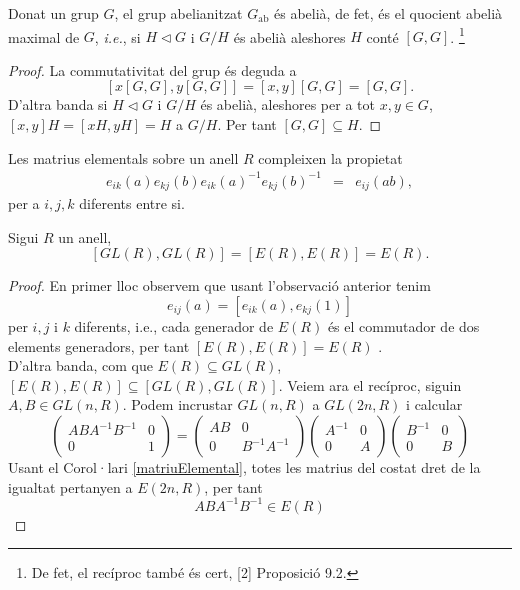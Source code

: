 \begin{prop}
Donat un grup $G$, el grup abelianitzat $G_\text{ab}$ és abelià, de fet, és el quocient abelià maximal de $G$, \textit{i.e.}, si $H\vartriangleleft G$ i $G/H$ és abelià aleshores $H$ conté $[G,G]$. \footnote{De fet, el recíproc també és cert, [2] Proposició 9.2.}

\end{prop}
\begin{proof}
La commutativitat del grup és deguda a 
$$
[x[G,G], y[G,G]] = [x,y][G,G] = [G,G].
$$
D'altra banda si $H\vartriangleleft G$ i $G/H$ és abelià, aleshores per a tot $x,y\in G$, $[x,y]H=[xH,yH]=H$ a $G/H$. Per tant $[G,G]\subseteq H$.
\end{proof}

\begin{obs}
Les matrius elementals sobre un anell $R$ compleixen la propietat 
\begin{eqnarray}
e_{ik}(a)e_{kj}(b)e_{ik}(a)^{-1}e_{kj}(b)^{-1}&=&e_{ij}(ab),  \label{prodMatriusConvenient}
\end{eqnarray}
per a $i,j,k$ diferents entre si.
\end{obs}

\begin{prop}
Sigui $R$ un anell, 
$$[GL(R),GL(R)] = [E(R),E(R)] = E(R).$$
\end{prop}

\begin{proof}
En primer lloc observem que usant l'observació anterior tenim 
$$
e_{ij}(a)=[e_{ik}(a),e_{kj}(1)]
$$
per $i,j$ i $k$ diferents, i.e., cada generador de $E(R)$ és el commutador de dos elements generadors, per tant $[E(R),E(R)]=E(R)$ . \\ \indent D'altra banda, com que $E(R)\subseteq GL(R)$, $[E(R),E(R)] \subseteq [GL(R), GL(R)]$. Veiem ara el recíproc, siguin $A,  B \in GL(n,R)$. Podem incrustar $GL(n,R)$ a $GL(2n,R)$ i calcular
$$
\left( \begin{matrix}
  ABA^{-1}B^{-1} & 0 \\
  0 & 1
 \end{matrix} \right) =  
 \left( \begin{matrix}
  AB & 0 \\
  0 & B^{-1}A^{-1}
 \end{matrix} \right)
 \left( \begin{matrix}
  A^{-1} & 0 \\
  0 & A
 \end{matrix} \right)
%
 \left( \begin{matrix}
  B^{-1} & 0 \\
  0 & B
 \end{matrix} \right) 
 $$
Usant el Corol·lari \ref{matriuElemental}, totes les matrius del costat dret de la igualtat pertanyen a $E(2n,R)$, per tant 
$$ABA^{-1}B^{-1}\in E(R)$$
\end{proof}

